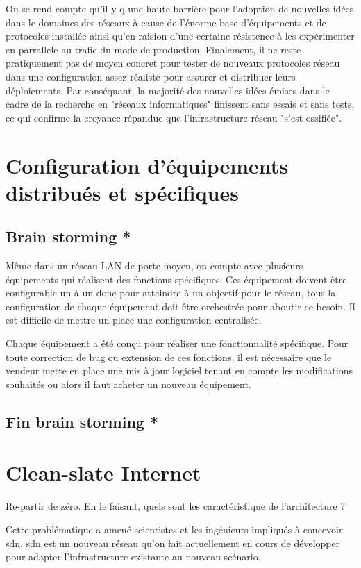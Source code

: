 \par
On se rend compte qu'il y q une haute barrière pour l'adoption de nouvelles idées dans le domaines des réseaux à cause de l'énorme base d'équipements et de protocoles installée ainsi qu'en raision d'une certaine résistence à les expérimenter en parrallele au trafic du mode de production. Finalement, il ne reste pratiquement pas de moyen concret pour tester de nouveaux protocoles réseau dans une configuration assez réaliste pour assurer et distribuer leurs déploiements. Par conséquant, la majorité des nouvelles idées émises dans le cadre de la recherche en "réseaux informatiques" finissent sans essais et sans tests, ce qui confirme la croyance répandue que l'infrastructure réseau "s'est ossifiée". \cite{OpenFlowStanford} 




\section{Configuration d'équipements distribués et spécifiques}

\subsection*{Brain storming *}

Même dans un réseau LAN de porte moyen,  on compte avec plusieurs équipements qui réalisent des fonctions spécifiques. Ces équipement doivent être configurable un à un donc pour atteindre à un objectif pour le réseau, tous la configuration de chaque équipement doit être orchestrée pour aboutir ce besoin. Il est difficile de mettre un place une configuration centralisée.

\par
Chaque équipement a été conçu pour réaliser une fonctionnalité spécifique. Pour toute correction de bug ou extension de ces fonctions,  il est nécessaire que le vendeur mette en place une mis à jour logiciel tenant en compte les modifications souhaités ou alors il faut acheter un nouveau équipement. 

\subsection*{Fin brain storming *}



\section{Clean-slate Internet}

Re-partir de zéro. En le faisant, quels sont les caractéristique de l'architecture ?


Cette problématique a amené scientistes et les ingénieurs impliqués à concevoir \gls{sdn}. \gls{sdn} est un nouveau  réseau qu'on fait actuellement en cours de développer pour adapter l'infrastructure existante au nouveau scénario.